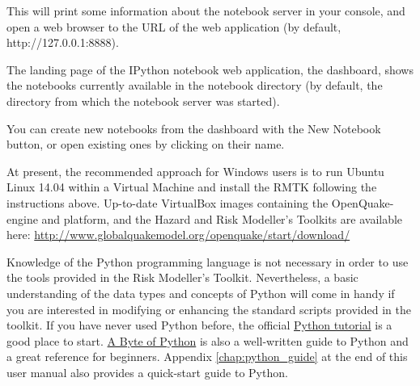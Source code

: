 This will print some information about the notebook server in your console, and open a web browser to the URL of the web application (by default, http://127.0.0.1:8888).

The landing page of the IPython notebook web application, the dashboard, shows the notebooks currently available in the notebook directory (by default, the directory from which the notebook server was started).

You can create new notebooks from the dashboard with the New Notebook button, or open existing ones by clicking on their name.

At present, the recommended approach for Windows users is to run Ubuntu Linux 14.04 within a Virtual Machine and install the RMTK following the instructions above. Up-to-date VirtualBox images containing the OpenQuake-engine and platform, and the Hazard and Risk Modeller's Toolkits are available here: \href{http://www.globalquakemodel.org/openquake/start/download/}{http://www.globalquakemodel.org/openquake/start/download/}

Knowledge of the Python programming language is not necessary in order to use the tools provided in the Risk Modeller's Toolkit. Nevertheless, a basic understanding of the data types and concepts of Python will come in handy if you are interested in modifying or enhancing the standard scripts provided in the toolkit. If you have never used Python before, the official \href{https://docs.python.org/2/tutorial/}{Python tutorial} is a good place to start. \href{http://www.swaroopch.com/notes/python/}{A Byte of Python} is also a well-written guide to Python and a great reference for beginners. Appendix \ref{chap:python_guide} at the end of this user manual also provides a quick-start guide to Python.